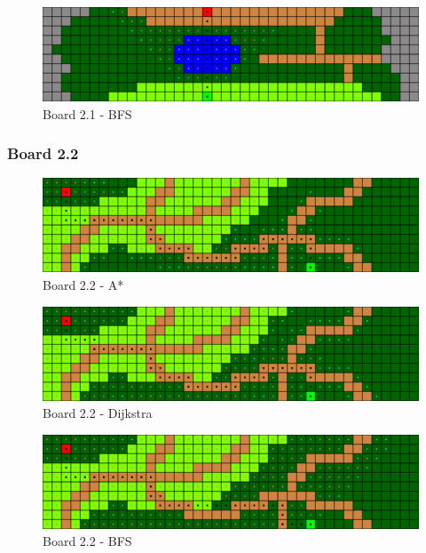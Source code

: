 \begin{figure}[h!]
  \centering
    \includegraphics[width=\textwidth]{img/board-2-1-bfs}
    \caption{Board 2.1 - BFS}
\end{figure}


\newpage

\subsubsection*{Board 2.2}

\begin{figure}[h!]
  \centering
    \includegraphics[width=\textwidth]{img/board-2-2-astar}
    \caption{Board 2.2 - A*}
\end{figure}

\begin{figure}[h!]
  \centering
    \includegraphics[width=\textwidth]{img/board-2-2-dijkstra}
    \caption{Board 2.2 - Dijkstra}
\end{figure}

\begin{figure}[h!]
  \centering
    \includegraphics[width=\textwidth]{img/board-2-2-bfs}
    \caption{Board 2.2 - BFS}
\end{figure}


